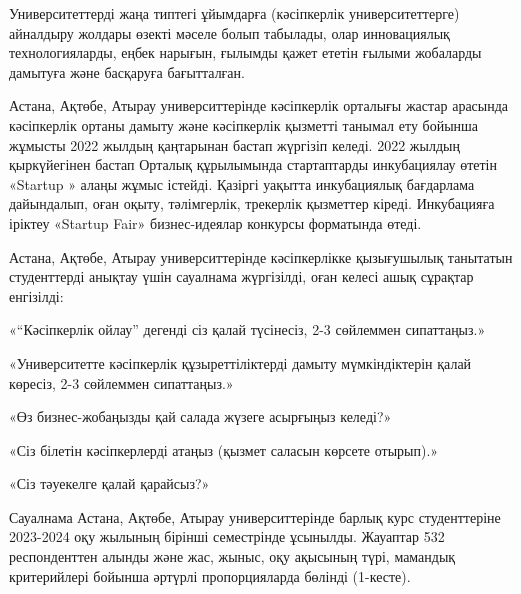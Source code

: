\begin{multicols}{2}
Университеттерді жаңа типтегі ұйымдарға (кәсіпкерлік университеттерге)
айналдыру жолдары өзекті мәселе болып табылады, олар инновациялық
технологияларды, еңбек нарығын, ғылымды қажет ететін ғылыми жобаларды
дамытуға және басқаруға бағытталған.

Астана, Ақтөбе, Атырау университтерінде кәсіпкерлік орталығы жастар
арасында кәсіпкерлік ортаны дамыту және кәсіпкерлік қызметті танымал ету
бойынша жұмысты 2022 жылдың қаңтарынан бастап жүргізіп келеді. 2022
жылдың қыркүйегінен бастап Орталық құрылымында стартаптарды инкубациялау
өтетін «Startup » алаңы жұмыс істейді. Қазіргі уақытта инкубациялық
бағдарлама дайындалып, оған оқыту, тәлімгерлік, трекерлік қызметтер
кіреді. Инкубацияға іріктеу «Startup Fair» бизнес-идеялар конкурсы
форматында өтеді.

Астана, Ақтөбе, Атырау университтерінде кәсіпкерлікке қызығушылық
танытатын студенттерді анықтау үшін сауалнама жүргізілді, оған келесі
ашық сұрақтар енгізілді:

«``Кәсіпкерлік ойлау'' дегенді сіз қалай түсінесіз, 2-3 сөйлеммен
сипаттаңыз.»

«Университетте кәсіпкерлік құзыреттіліктерді дамыту мүмкіндіктерін қалай
көресіз, 2-3 сөйлеммен сипаттаңыз.»

«Өз бизнес-жобаңызды қай салада жүзеге асырғыңыз келеді?»

«Сіз білетін кәсіпкерлерді атаңыз (қызмет саласын көрсете отырып).»

«Сіз тәуекелге қалай қарайсыз?»

Сауалнама Астана, Ақтөбе, Атырау университтерінде барлық курс
студенттеріне 2023-2024 оқу жылының бірінші семестрінде ұсынылды.
Жауаптар 532 респонденттен алынды және жас, жыныс, оқу ақысының түрі,
мамандық критерийлері бойынша әртүрлі пропорцияларда бөлінді (1-кесте).
\end{multicols}


